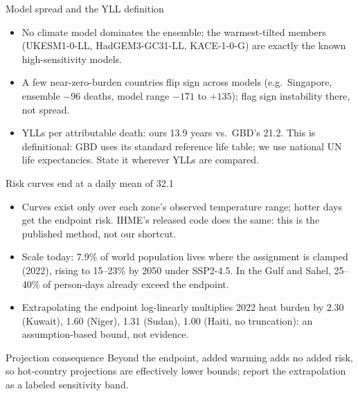 \documentclass[aspectratio=169,11pt]{beamer}
\begin{document}
\begin{frame}{Model spread and the YLL definition}
  \begin{itemize}
    \item No climate model dominates the ensemble; the warmest-tilted
      members (UKESM1-0-LL, HadGEM3-GC31-LL, KACE-1-0-G) are exactly the
      known high-sensitivity models.
    \item A few near-zero-burden countries flip sign across models (e.g.\
      Singapore, ensemble \(-96\) deaths, model range \(-171\) to
      \(+135\)); flag sign instability there, not spread.
    \item YLLs per attributable death: ours 13.9 years vs.\ GBD's 21.2. This
      is definitional: GBD uses its standard reference life table; we use
      national UN life expectancies. State it wherever YLLs are compared.
  \end{itemize}
\end{frame}


\begin{frame}{Risk curves end at a daily mean of 32.1\,\textcelsius}
  \begin{itemize}
    \item Curves exist only over each zone's observed temperature range;
      hotter days get the endpoint risk. IHME's released code does the same:
      this is the published method, not our shortcut.
    \item Scale today: 7.9\% of world population lives where the assignment
      is clamped (2022), rising to 15--23\% by 2050 under SSP2-4.5. In the
      Gulf and Sahel, 25--40\% of person-days already exceed the endpoint.
    \item Extrapolating the endpoint log-linearly multiplies 2022 heat
      burden by 2.30 (Kuwait), 1.60 (Niger), 1.31 (Sudan), 1.00 (Haiti,
      no truncation): an assumption-based bound, not evidence.
  \end{itemize}
  \begin{alertblock}{Projection consequence}
    Beyond the endpoint, added warming adds no added risk, so hot-country
    projections are effectively lower bounds; report the extrapolation as a
    labeled sensitivity band.
  \end{alertblock}
\end{frame}
\end{document}
